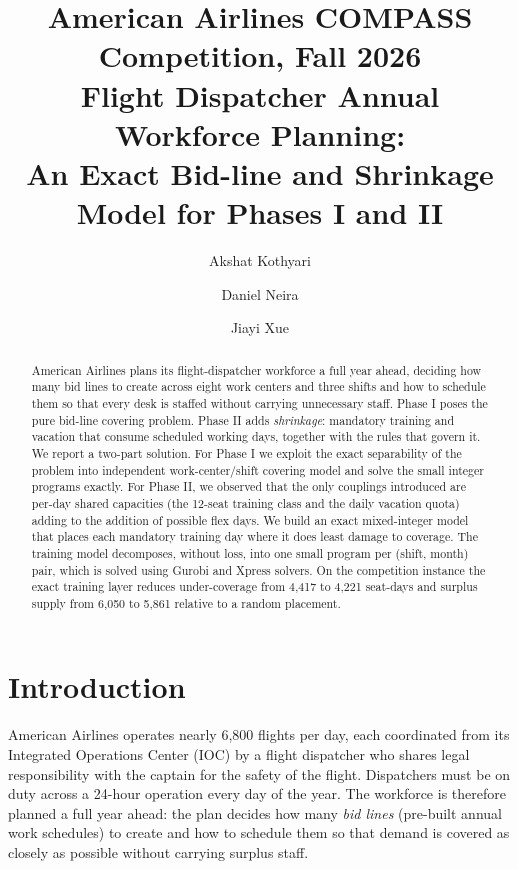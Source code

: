 \documentclass[preprint,12pt]{elsarticle}
\begin{document}
\begin{frontmatter}

\title{\textbf{American Airlines COMPASS Competition, Fall 2026}\\Flight Dispatcher Annual Workforce Planning:\\ An Exact Bid-line and Shrinkage Model for Phases I and II}

\author[1,2]{Akshat Kothyari}
\author[1,2]{Daniel Neira}
\author[1,3]{Jiayi Xue}

\begin{abstract}
   American Airlines plans its flight-dispatcher workforce a full year ahead, deciding how many bid lines to create across eight work centers and three shifts and how to schedule them so that every desk is staffed without carrying unnecessary staff. Phase I poses the pure bid-line covering problem. Phase II adds \emph{shrinkage}: mandatory training and vacation that consume scheduled working days, together with the rules that govern it. We report a two-part solution. For Phase I we exploit the exact separability of the problem into independent work-center/shift covering model and solve the small integer programs exactly. For Phase II, we observed that the only couplings introduced are per-day shared capacities (the 12-seat training class and the daily vacation quota) adding to the addition of possible flex days. We build an exact mixed-integer model that places each mandatory training day where it does least damage to coverage. The training model decomposes, without loss, into one small program per (shift, month) pair, which is solved using Gurobi and Xpress solvers. On the competition instance the exact training layer reduces under-coverage from 4,417 to 4,221 seat-days and surplus supply from 6,050 to 5,861 relative to a random placement.
\end{abstract}


\end{frontmatter}

\section{Introduction}
American Airlines operates nearly 6,800 flights per day, each coordinated from its Integrated Operations Center (IOC) by a flight dispatcher who shares legal responsibility with the captain for the safety of the flight. Dispatchers must be on duty across a 24-hour operation every day of the year. The workforce is therefore planned a full year ahead: the plan decides how many \emph{bid lines} (pre-built annual work schedules) to create and how to schedule them so that demand is covered as closely as possible without carrying surplus staff.
\end{document}

